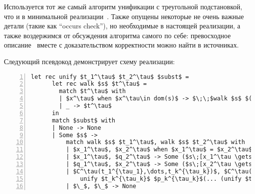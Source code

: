 
Используется тот же самый алгоритм унификации с треугольной подстановкой, что и в минимальной реализации~\cite{MicroKanren}.
Также опущены некоторые не очень важные детали (такие как \enquote{occurs check}), но необходимые в настоящей реализации, а также воздержимся от обсуждения алгоритма самого по себе: превосходное описание~\cite{Kumar} вместе с доказательством корректности можно найти в источниках.


Следующий псевдокод демонстрирует схему реализации:

\begin{lstlisting}[mathescape=true,numbers=left,numberstyle=\small,stepnumber=1,numbersep=-5pt]
    let rec unify $t_1^\tau$ $t_2^\tau$ $subst$ =
      let rec walk $s$ $t^\tau$ =
        match $t^\tau$ with
        | $x^\tau$ when $x^\tau\in dom(s)$ -> $\;\;$walk $s$ $(s\;\;x^\tau)$
        | _ -> $t^\tau$
      in
      match $subst$ with
      | None -> None
      | Some $s$ ->
          match walk $s$ $t_1^\tau$, walk $s$ $t_2^\tau$ with
          | $x_1^\tau$, $x_2^\tau$ when $x_1^\tau$ = $x_2^\tau$ -> $subst$
          | $x_1^\tau$, $q_2^\tau$ -> Some ($s\;[x_1^\tau \gets q_2^\tau]$)
          | $q_1^\tau$, $x_2^\tau$ -> Some ($s\;[x_2^\tau \gets q_1^\tau]$)
          | $C^\tau(t_1^{\tau_1},\dots,t_k^{\tau_k})$, $C^\tau(p_1^{\tau_1},\dots,p_k^{\tau_k})$ ->
              unify $t_k^{\tau_k}$ $p_k^{\tau_k}$(... (unify $t_1^{\tau_1}$ $p_1^{\tau_1}$ $subst$)$...$)
          | $\_$, $\_$ -> None
\end{lstlisting}

